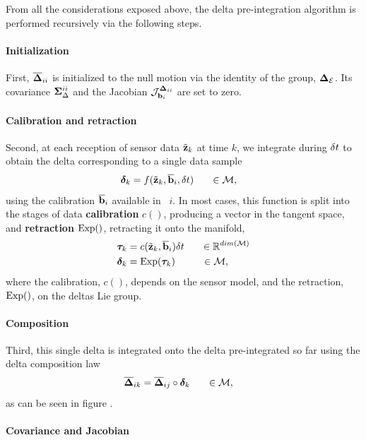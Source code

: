 From all the considerations exposed above, the delta pre-integration algorithm is performed recursively via the following steps.

\paragraph{Initialization}
First, $\overline{{{\bm \Delta}}}_{ii}$ is initialized to the null motion via the identity of the group, ${{\bm \Delta}}_{\mathcal{E}}$. 
Its covariance ${\bm \Sigma}_\Delta^{ii}$ and the Jacobian ${\mathcal{J}^{{{\bm \Delta}}_{ii}}_{{\bf b}_i}}$ are set to zero. 

\paragraph{Calibration and retraction}
Second, at each reception of sensor data $\tilde{{\bf z}}_k$ at time $k$, we integrate during $\delta t$ to obtain the delta corresponding to a single data sample
%
\begin{align}
    \bm\delta_k &= f(\tilde{{\bf z}}_k, \overline{{\bf b}}_i, \delta t)  ~~~~~\in \mathcal{M}, 
    \label{eq:data2delta}
\end{align}
%
using the calibration $\overline{{\bf b}}_i$ available in \keyframe\ $i$. 
In most cases, this function is split into the stages of data \textbf{calibration} $c()$, producing a vector in the tangent space, and \textbf{retraction} $\operatorname*{Exp}()$, retracting 
it onto the manifold,
%
\begin{align}
    {\bm \tau}_k &= c(\tilde{{\bf z}}_k, \overline{{\bf b}}_i) \delta t ~~~~~\in \mathbb{R}^{dim(\mathcal{M})}\\
    \bm\delta_k &= \operatorname*{Exp}({\bm \tau}_k) ~~~~~~~~\in \mathcal{M},
\end{align}
%
where the calibration, $c()$, depends on the sensor model, and the retraction, $\operatorname*{Exp}()$, on the deltas Lie group.

\paragraph{Composition}
Third, this single delta is integrated onto the delta pre-integrated so far using the delta composition law
%
\begin{align}
    \overline{{{\bm \Delta}}}_{ik} &= \overline{{{\bm \Delta}}}_{ij} \circ \bm\delta_k ~~~~~\in \mathcal{M},
    \label{eq:deltaPlusDelta}
\end{align}
%
as can be seen in figure .


\paragraph{Covariance and Jacobian}

